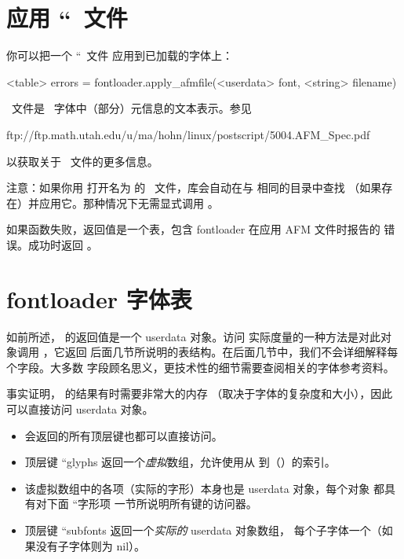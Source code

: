 \section{应用 ``\AFM\ 文件}

\topicindex {\TYPEONE}


你可以把一个 ``\AFM\ 文件 应用到已加载的字体上：

\begin{typing}
<table> errors = fontloader.apply_afmfile(<userdata> font, <string> filename)
\end{typing}

\AFM\ 文件是 \TYPEONE\ 字体中（部分）元信息的文本表示。参见

\begin{typing}
ftp://ftp.math.utah.edu/u/ma/hohn/linux/postscript/5004.AFM_Spec.pdf
\end{typing}

以获取关于 \AFM\ 文件的更多信息。

注意：如果你用  打开名为  的
\TYPEONE\ 文件，库会自动在与  相同的目录中查找
（如果存在）并应用它。那种情况下无需显式调用
。

如果函数失败，返回值是一个表，包含 fontloader 在应用 AFM 文件时报告的
错误。成功时返回 。

\section{fontloader 字体表}\label{fontloadertables}



如前所述， 的返回值是一个 userdata 对象。访问
实际度量的一种方法是对此对象调用 ，它返回
后面几节所说明的表结构。在后面几节中，我们不会详细解释每个字段。大多数
字段顾名思义，更技术性的细节需要查阅相关的字体参考资料。

事实证明， 的结果有时需要非常大的内存
（取决于字体的复杂度和大小），因此可以直接访问 userdata 对象。

\begin{itemize}\item {} 会返回的所有顶层键也都可以直接访问。

\item 顶层键 ``glyphs 返回一个{\it 虚拟\/}数组，允许使用从
     到（）的索引。

\item 该虚拟数组中的各项（实际的字形）本身也是 userdata 对象，每个对象
    都具有对下面 ``字形项 一节所说明所有键的访问器。

\item 顶层键 ``subfonts 返回一个{\it 实际的} userdata 对象数组，
    每个子字体一个（如果没有子字体则为 nil）。

\end{itemize}


